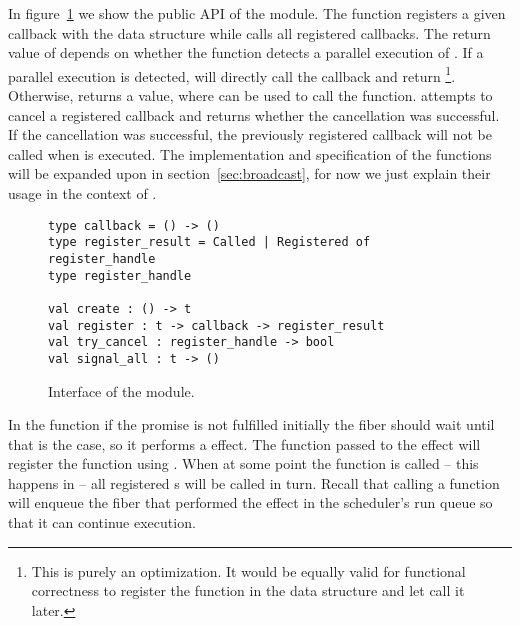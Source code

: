 In figure~\ref{fig:sched-impl-broadcast} we show the public API of the  module.
The  function registers a given callback with the data structure while  calls all registered callbacks.
The return value of  depends on whether the function detects a parallel execution of .
If a parallel execution is detected,  will directly call the callback and return \footnote{This is purely an optimization. It would be equally valid for functional correctness to register the  function in the data structure and let  call it later.}.
Otherwise,  returns a  value, where  can be used to call the  function.
 attempts to cancel a registered callback and returns whether the cancellation was successful.
If the cancellation was successful, the previously registered callback will not be called when  is executed.
The implementation and specification of the functions will be expanded upon in section~\ref{sec:broadcast}, for now we just explain their usage in the context of .

\begin{figure}[ht]
  \begin{verbatim}
type callback = () -> ()
type register_result = Called | Registered of register_handle
type register_handle

val create : () -> t
val register : t -> callback -> register_result
val try_cancel : register_handle -> bool
val signal_all : t -> ()
  \end{verbatim}
  \caption{Interface of the  module.}
  \label{fig:sched-impl-broadcast}
\end{figure}

In the  function if the promise is not fulfilled initially the fiber should wait until that is the case, so it performs a \esuspend{} effect.
The  function passed to the effect will register the  function using .
When at some point the  function is called -- this happens in  -- all registered s will be called in turn.
Recall that calling a  function will enqueue the fiber that performed the \esuspend{} effect in the scheduler's run queue so that it can continue execution.

